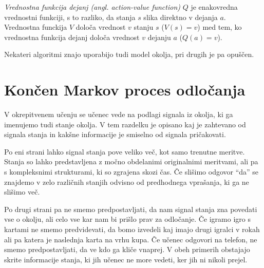 \documentclass[a4paper, oneside, 12pt]{report}
\begin{document}
{\em Vrednostna funkcija dejanj (angl. action-value function)} $Q$ je enakovredna vrednostni funkciji, s to razliko, da stanja $s$ slika direktno v dejanja $a$. Vrednostna funckija $V$ določa vrednost $v$ stanju $s$ ($V(s) = v$) med tem, ko vrednostna funkcija dejanj določa vrednost $v$ dejanju $a$ ($Q(a) = v$).

Nekateri algoritmi znajo uporabijo tudi model okolja, pri drugih je pa opuščen.

\section{Končen Markov proces odločanja}
V okrepitvenem učenju se učenec vede na podlagi signala iz okolja, ki ga imenujemo tudi stanje okolja. V tem razdelku je opisano kaj je zahtevano od signala stanja in kakšne informacije je smiselno od signala pričakovati.

Po eni strani lahko signal stanja pove veliko več, kot samo trenutne meritve. Stanja so lahko predstavljena z močno obdelanimi originalnimi meritvami, ali pa s kompleksnimi strukturami, ki so zgrajena skozi čas. Če slišimo odgovor ``da'' se znajdemo v zelo različnih stanjih odvisno od predhodnega vprašanja, ki ga ne slišimo več.

Po drugi strani pa ne smemo predpostavljati, da nam signal stanja zna povedati vse o okolju, ali celo vse kar nam bi prišlo prav za odločanje. Če igramo igro s kartami ne smemo predvidevati, da bomo izvedeli kaj imajo drugi igralci v rokah ali pa katera je naslednja karta na vrhu kupa. Če učenec odgovori na telefon, ne smemo predpostavljati, da ve kdo ga kliče vnaprej. V obeh primerih obstajajo skrite informacije stanja, ki jih učenec ne more vedeti, ker jih ni nikoli prejel.
\end{document}
